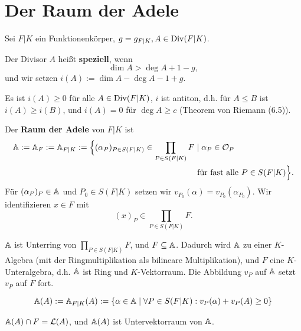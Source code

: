 \section{Der Raum der Adele}
Sei $F|K$ ein Funktionenkörper, $g = g_{F|K}, A \in \operatorname{Div}(F|K)$.

\begin{definition}
    Der Divisor $A$ heißt \textbf{speziell}, wenn 
    $$ \dim A > \deg A + 1 - g,$$
    und wir setzen $i(A) := \dim A - \deg A - 1 +g$.
\end{definition}

\begin{bemerkungnr}
    Es ist $i(A) \geq 0$ für alle $A \in \operatorname{Div}(F|K)$,
    $i$ ist antiton, d.h. für $A \leq B$ ist $i(A) \geq i(B)$, und
    $i(A) = 0$ für $\deg A \geq c$ (Theorem von Riemann (6.5)).
\end{bemerkungnr}

\begin{definition}
    Der \textbf{Raum der Adele} von $F|K$ ist
    \begin{align*} 
        \mathbb{A} := \mathbb{A}_F := \mathbb{A}_{F|K} := \Big\{(\alpha_P)_{P \in S(F|K)} \in \prod\limits_{P \in S(F|K)} F &\mid \alpha_P \in \mathcal{O}_P\\\
        &\text{ für fast alle } P \in S(F|K)\Big\}.
    \end{align*}
    Für $(\alpha_P)_P \in \mathbb{A}$ und $P_0 \in S(F|K)$ setzen wir $v_{P_0}(\alpha) = v_{P_0}(\alpha_{P_0})$.
    Wir identifizieren $x \in F$ mit $$(x)_P \in \prod\limits_{P \in S(F|K)} F.$$
\end{definition}

\begin{bemerkungnr}
    $\mathbb{A}$ ist Unterring von $\prod\limits_{P \in S(F|K)} F$, und $F \subseteq \mathbb{A}$.
    Dadurch wird $\mathbb{A}$ zu einer $K$-Algebra (mit der Ringmultiplikation als bilineare Multiplikation), und $F$ eine $K$-Unteralgebra, d.h.
    $\mathbb{A}$ ist Ring und $K$-Vektorraum.
    Die Abbildung $v_P$ auf $\mathbb{A}$ setzt $v_P$ auf $F$ fort.
\end{bemerkungnr}

\begin{definition}
    $$\mathbb{A}(A) := \mathbb{A}_{F|K}(A) := \{\alpha \in \mathbb{A} \mid\forall P \in S(F|K): v_P(\alpha) + v_P(A) \geq 0\}$$
\end{definition}

\begin{bemerkungnr}
    $\mathbb{A}(A) \cap F = \mathcal{L}(A)$, und $\mathbb{A}(A)$ ist Untervektorraum von $\mathbb{A}$.
\end{bemerkungnr}

